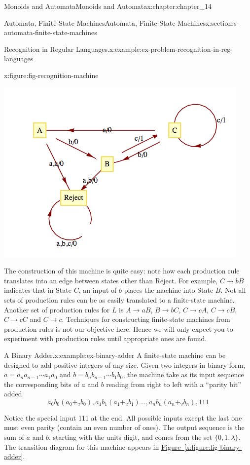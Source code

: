 \documentclass[oneside,10pt,]{book}
\newcommand{\xreffont}{\relax}
\numberwithin{equation}{section}
\begin{document}
\begin{chapterptx}{Monoids and Automata}{}{Monoids and Automata}{}{}{x:chapter:chapter_14}
\begin{sectionptx}{Automata, Finite-State Machines}{}{Automata, Finite-State Machines}{}{}{x:section:s-automata-finite-state-machines}
\begin{example}{Recognition in Regular Languages.}{x:example:ex-problem-recognition-in-reg-languages}
\begin{figureptx}{}{x:figure:fig-recognition-machine}{}
\begin{image}{0.15}{0.7}{0.15}
\includegraphics[width=\linewidth]{images/fig-recognition-machine.png}
\end{image}%
\tcblower
\end{figureptx}%
The construction of this machine is quite easy: note how each production rule translates into an edge between states other than Reject. For example, \(C\to bB\) indicates that in State \(C\), an input of \(b\) places the machine into State \(B\). Not all sets of production rules can be as easily translated to a finite-state machine. Another set of production rules for \(L\) is \(A\to aB\), \(B\to bC\), \(C\to cA\), \(C\to cB\), \(C\to cC\) and \(C\to c\). Techniques for constructing finite-state machines from production rules is not our objective here. Hence we will only expect you to experiment with production rules until appropriate ones are found.%
\end{example}
\begin{example}{A Binary Adder.}{x:example:ex-binary-adder}%
A finite-state machine can be designed to add positive integers of any size. Given two integers in binary form, \(a=a_na_{n-1} \cdots  a_1a_0\) and \(b=b_n b_{n-1}\cdots  b_1b_0\), the machine take as its input sequence the corresponding bits of \(a\) and \(b\) reading from right to left with a ``parity bit'' added%
\begin{equation*}
a_0b_0\left(a_0+_2b_0\right) ,a_1b_1\left(a_1+_2b_1\right) \ldots  , a_nb_n\left(a_n+_2b_n\right),111
\end{equation*}
%
\par
Notice the special input 111 at the end. All possible inputs except the last one must even parity (contain an even number of ones). The output sequence is the sum of \(a\) and \(b\), starting with the units digit, and comes from the set \(\{0,1,\lambda \}\). The transition diagram for this machine appears in \hyperref[x:figure:fig-binary-adder]{Figure~{\xreffont\ref{x:figure:fig-binary-adder}}}.%

\end{example}
\end{sectionptx}
\end{chapterptx}
\end{document}
